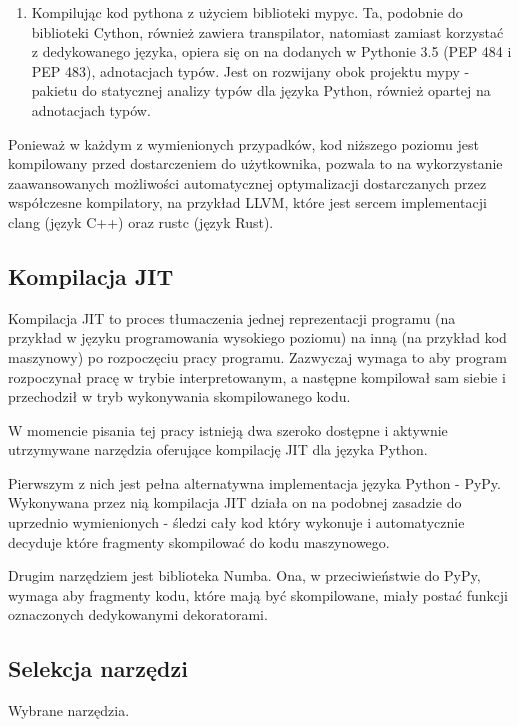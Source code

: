 \documentclass[11pt, a4paper]{article}
\begin{document}
\begin{sloppypar}
\begin{enumerate}
      \item Kompilując kod pythona z użyciem biblioteki mypyc\cite{mypyc}. Ta, podobnie
        do biblioteki Cython, również zawiera transpilator, natomiast zamiast korzystać
        z dedykowanego języka, opiera się on na dodanych w Pythonie 3.5\cite{Python_3_5}
        (PEP 484\cite{PEP_484} i PEP 483\cite{PEP_483}), adnotacjach typów. Jest on
        rozwijany obok projektu mypy - pakietu do statycznej analizy typów dla języka
        Python, również opartej na adnotacjach typów\cite{mypy}.
    \end{enumerate}

    Ponieważ w każdym z wymienionych przypadków, kod niższego poziomu jest kompilowany przed
    dostarczeniem do użytkownika, pozwala to na wykorzystanie zaawansowanych możliwości
    automatycznej optymalizacji dostarczanych przez współczesne kompilatory, na przykład
    LLVM, które jest sercem implementacji clang\cite{ClangHomePage} (język C++) oraz rustc
    (język Rust).

    \subsection{Kompilacja JIT}
    Kompilacja JIT to proces tłumaczenia jednej reprezentacji programu (na przykład w
    języku programowania wysokiego poziomu) na inną (na przykład kod maszynowy) po rozpoczęciu
    pracy programu. Zazwyczaj wymaga to aby program rozpoczynał pracę w trybie
    interpretowanym, a następne kompilował sam siebie i przechodził w tryb wykonywania skompilowanego
    kodu.

    W momencie pisania tej pracy istnieją dwa szeroko dostępne i aktywnie utrzymywane narzędzia
    oferujące kompilację JIT dla języka Python.

    Pierwszym z nich jest pełna alternatywna implementacja języka Python - PyPy\cite{PyPy_Home_Page}.
    Wykonywana przez nią kompilacja JIT działa on na podobnej zasadzie do uprzednio wymienionych
    - śledzi cały kod który wykonuje i automatycznie decyduje które fragmenty skompilować
    do kodu maszynowego\cite{PyPy_JIT}.

    Drugim narzędziem jest biblioteka Numba\cite{Numba_Article}\cite{Numba_Doc}. Ona, w
    przeciwieństwie do PyPy, wymaga aby fragmenty kodu, które mają być skompilowane, miały
    postać funkcji oznaczonych dedykowanymi dekoratorami.

    \subsection{Selekcja narzędzi}
    \FloatBarrier
    \begin{table}[ht]
      \centering
      
      \caption{Wybrane narzędzia.}
      \label{selected-tool}
    \end{table}
    \FloatBarrier


\end{sloppypar}
\end{document}
